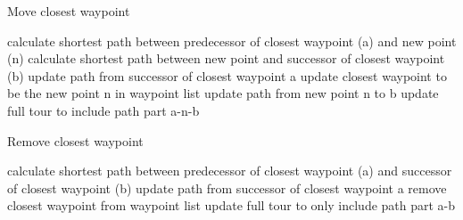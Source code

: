 \begin{breakablealgorithm}
	\caption{Move closest waypoint}
	\label{alg:SAGenerateNeigborhoodMove}
	\begin{algorithmic}[1]
		\STATE calculate shortest path between predecessor of closest waypoint (a) and new point (n)
		\STATE calculate shortest path between new point and successor of closest waypoint (b)
		\STATE update path from successor of closest waypoint a
		\STATE update closest waypoint to be the new point n in waypoint list
		\STATE update path from new point n to b
		\STATE update full tour to include path part a-n-b
	\end{algorithmic}
\end{breakablealgorithm}

\begin{breakablealgorithm}
	\caption{Remove closest waypoint}
	\label{alg:SAGenerateNeigborhoodRemove}
	\begin{algorithmic}[1]
		\STATE calculate shortest path between predecessor of closest waypoint (a) and successor of closest waypoint (b)
		\STATE update path from successor of closest waypoint a
		\STATE remove closest waypoint from waypoint list
		\STATE update full tour to only include path part a-b
	\end{algorithmic}
\end{breakablealgorithm}

